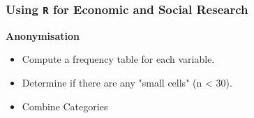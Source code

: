 



\begin{frame}[fragile]
\frametitle{Using \texttt{R} for Economic and Social Research}

\textbf{Anonymisation}

\begin{itemize}
\item Compute a frequency table for each variable.
\item Determine if there are any "small cells" (n < 30).
\item Combine Categories
\end{itemize}

\end{frame}
